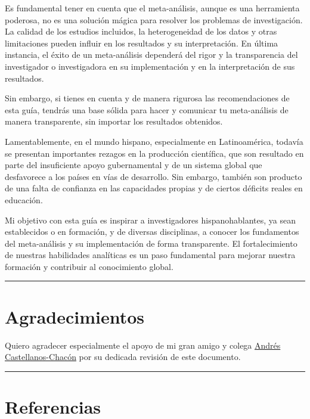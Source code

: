 \documentclass[
  bookmarksnumbered]{article}
\begin{document}
Es fundamental tener en cuenta que el meta-análisis, aunque es una herramienta poderosa, no es una solución mágica para resolver los problemas de investigación. La calidad de los estudios incluidos, la heterogeneidad de los datos y otras limitaciones pueden influir en los resultados y su interpretación. En última instancia, el éxito de un meta-análisis dependerá del rigor y la transparencia del investigador o investigadora en su implementación y en la interpretación de sus resultados.

Sin embargo, si tienes en cuenta y de manera rigurosa las recomendaciones de esta guía, tendrás una base sólida para hacer y comunicar tu meta-análisis de manera transparente, sin importar los resultados obtenidos.

Lamentablemente, en el mundo hispano, especialmente en Latinoamérica, todavía se presentan importantes rezagos en la producción científica, que son resultado en parte del insuficiente apoyo gubernamental y de un sistema global que desfavorece a los países en vías de desarrollo. Sin embargo, también son producto de una falta de confianza en las capacidades propias y de ciertos déficits reales en educación.

Mi objetivo con esta guía es inspirar a investigadores hispanohablantes, ya sean establecidos o en formación, y de diversas disciplinas, a conocer los fundamentos del meta-análisis y su implementación de forma transparente. El fortalecimiento de nuestras habilidades analíticas es un paso fundamental para mejorar nuestra formación y contribuir al conocimiento global.

\begin{center}\rule{0.5\linewidth}{0.5pt}\end{center}

\hypertarget{agradecimientos}{%
\section*{Agradecimientos}\label{agradecimientos}}

Quiero agradecer especialmente el apoyo de mi gran amigo y colega \href{https://scholar.google.es/citations?user=od6gf0wAAAAJ\&hl=es}{Andrés Castellanos-Chacón} por su dedicada revisión de este documento.

\begin{center}\rule{0.5\linewidth}{0.5pt}\end{center}

\hypertarget{referencias}{%
\section*{Referencias}\label{referencias}}
\end{document}
